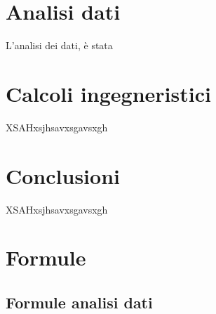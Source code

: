 \documentclass[a4paper,10pt]{article}                                                                                       %
\begin{document}
\section{Analisi dati}                                                                                                      %
\label{sec:data_analysis}                                                                                                   %
  L'analisi dei dati, è stata 

\section{Calcoli ingegneristici}                                                                                            %
\label{sec:engineering_calcs}                                                                                               %
  XSAHxsjhsavxsgavsxgh

\section{Conclusioni}                                                                                                       %
\label{sec:conclusions}                                                                                                     %
  XSAHxsjhsavxsgavsxgh

\section{Formule}                                                                                                           %
\label{sec:formulas}                                                                                                        %
\subsection{Formule analisi dati}                                                                                           %
\label{subsec:da_formulas}                                                                                                  %
\end{document}
